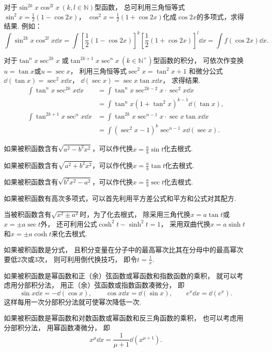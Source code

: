 对于\(\sin^{2k} x \cos^{2l} x\ (k,l \in \mathbb{N})\)型函数，
总可利用三角恒等式\(\sin^2 x = \frac12(1-\cos 2x)\)，
\(\cos^2 x = \frac12(1+\cos 2x)\)化成\(\cos 2x\)的多项式，求得结果.
例如：\[
	\int \sin^{2k} x \cos^{2l} x \dd{x}
	= \int \left[\frac12(1-\cos 2x)\right]^k
		\left[\frac12(1+\cos 2x)\right]^l \dd{x}
	= \int f(\cos 2x) \dd{x}.
\]

对于\(\tan^n x \sec^{2k} x\)
或\(\tan^{2k+1} x \sec^n x\ (k \in \mathbb{N}^+)\)型函数的积分，
可依次作变换\(u=\tan x\)或\(u=\sec x\)，
利用三角恒等式\(\sec^2 x = \tan^2 x + 1\)
和微分公式\(\dd(\tan x) = \sec^2 x \dd{x}\)，
\(\dd(\sec x) = \sec x \tan x \dd{x}\)，
求得结果.
\begin{align*}
	\int \tan^n x \sec^{2k} x \dd{x}
	&=\int \tan^n x\sec^{2k-2} x \cdot \sec^2 x \dd{x} \\
	&=\int \tan^n x(1+\tan^2 x)^{k-1} \dd(\tan x), \\
	\int \tan^{2k+1} x \sec^n x \dd{x}
	&=\int \tan^{2k} x \sec^{n-1} x \cdot \sec x\tan x\dd{x} \\
	&=\int (\sec^2 x - 1)^k \sec^{n-1} x \dd(\sec x).
\end{align*}

如果被积函数含有\(\sqrt{a^2 - b^2 x^2}\)，可以作代换\(x = \frac{a}{b} \sin t\)化去根式.

如果被积函数含有\(\sqrt{a^2 + b^2 x^2}\)，可以作代换\(x = \frac{a}{b} \tan t\)化去根式.

如果被积函数含有\(\sqrt{b^2 x^2 - a^2}\)，可以作代换\(x = \frac{a}{b} \sec t\)化去根式.

如果被积函数有高次多项式，可以首先利用平方差公式和平方和公式对其配方.

当被积函数含有\(\sqrt{x^2 \pm a^2}\)时，为了化去根式，
除采用三角代换\(x = a \tan t\)或\(x = \pm a \sec t\)外，
还可利用公式\(\cosh^2 t - \sinh^2 t = 1\)，
采用双曲代换\(x = a \sinh t\)和\(x = \pm a \cosh t\)来化去根式.

如果被积函数是分式，
且积分变量在分子中的最高幂次比其在分母中的最高幂次要低2次或3次，
则可利用倒代换技巧，
即令\(t=\frac{1}{x}\).

如果被积函数是幂函数和正（余）弦函数或幂函数和指数函数的乘积，
就可以考虑用分部积分法，
用正（余）弦函数或指数函数凑微分，
即\begin{equation*}
	\sin x \dd{x} = -\dd(\cos x),
	\qquad
	\cos x \dd{x} = \dd(\sin x),
	\qquad
	e^x \dd{x} = \dd(e^x).
\end{equation*}
这样每用一次分部积分法就可使幂次降低一次.

如果被积函数是幂函数和对数函数或幂函数和反三角函数的乘积，
也可以考虑用分部积分法，
用幂函数凑微分，
即\begin{equation*}
	x^\mu \dd{x} = \frac1{\mu+1} \dd(x^{\mu+1}).
\end{equation*}

